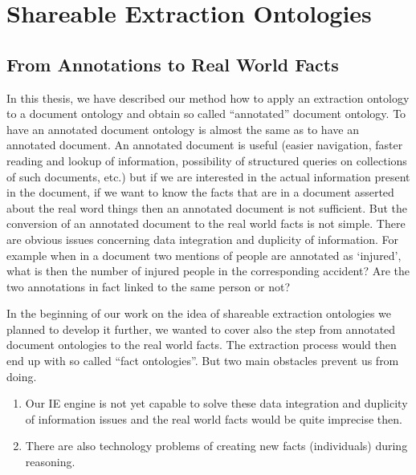\section{Shareable Extraction Ontologies} 

\subsection{From Annotations to Real World Facts} \label{sec:onto_discuss}


In this thesis, we have described our method how to apply an extraction ontology to a document ontology and obtain so called ``annotated'' document ontology. To have an annotated document ontology is almost the same as to have an annotated document. An annotated document is useful (easier navigation, faster reading and lookup of information, possibility of structured queries on collections of such documents, etc.) but if we are interested in the actual information present in the document, if we want to know the facts that are in a document asserted about the real word things then an annotated document is not sufficient. But the conversion of an annotated document to the real world facts is not simple.
There are obvious issues concerning data integration and duplicity of information. For example when in a document two mentions of people are annotated as `injured', what is then the number of injured people in the corresponding accident? Are the two annotations in fact linked to the same person or not?

In the beginning of our work on the idea of shareable extraction ontologies we planned to develop it further, we wanted to cover also the step from annotated document ontologies to the real world facts. The extraction process would then end up with so called ``fact ontologies''. But two main obstacles prevent us from doing.

\begin{enumerate}
	\item Our IE engine is not yet capable to solve these data integration and duplicity of information issues and the real world facts would be quite imprecise then.
	\item There are also technology problems of creating new facts (individuals) during reasoning.
\end{enumerate}

